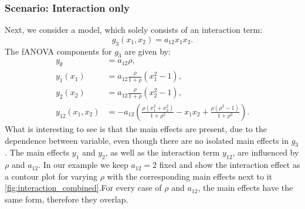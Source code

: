 \subsubsection*{Scenario: Interaction only}
Next, we consider a model, which solely consists of an interaction term:
$$g_3(x_1, x_2) = a_{12} x_1 x_2.$$
The fANOVA components for $g_3$ are given by:
\begin{align*}
    y_{\emptyset} &= a_{12} \rho, \\
    y_{1}(x_1) &= a_{12} \frac{\rho}{1+ \rho} (x_1^2 - 1), \\
    y_{2}(x_2) &= a_{12} \frac{\rho}{1+ \rho} (x_2^2 - 1), \\
    y_{12}(x_1,x_2) 
&= -a_{12}\!\left(
    \frac{\rho(x_1^2+x_2^2)}{1+\rho^2} 
    - x_1 x_2 
    + \frac{\rho(\rho^2-1)}{1+\rho^2}
   \right).
\end{align*}
What is interesting to see is that the main effects are present, due to the dependence between variable, even though there are no isolated main effects in $g_3$.
The main effects $y_1$ and $y_2$, as well as the interaction term $y_{12}$, are influenced by $\rho$ and $a_{12}$.
In our example we keep $a_{12} = 2$ fixed and show the interaction effect as a contour plot for varying $\rho$ with the corresponding main effects next to it \autoref{fig:interaction_combined}.For every case of $\rho$ and $a_{12}$, the main effects have the same form, therefore they overlap.
